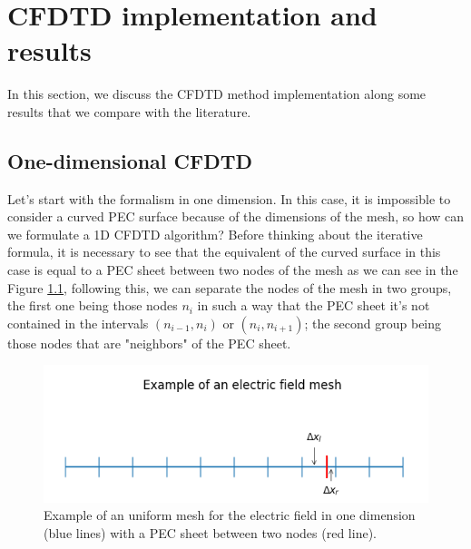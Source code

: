 \documentclass[12pt, oneside]{book}
\begin{document}
\chapter{CFDTD implementation and results}

In this section, we discuss the CFDTD method implementation along some results that we compare with the literature.
\section{One-dimensional CFDTD}
Let's start with the formalism in one dimension. In this case, it is impossible to consider a curved PEC surface because of the dimensions of the mesh, so how can we formulate a 1D CFDTD algorithm? Before thinking about the iterative formula, it is necessary to see that the equivalent of the curved surface in this case is equal to a PEC sheet between two nodes of the mesh as we can see in the Figure \ref{fig:Mesh1D_CFDTD}, following this, we can separate the nodes of the mesh in two groups, the first one being those nodes $n_i$ in such a way that the PEC sheet it's not contained in the intervals $(n_{i-1}, n_i)$ or $(n_i, n_{i+1})$; the second group being those nodes that are "neighbors" of the PEC sheet. 
\begin{figure}[H]
    \centering
    \includegraphics[scale=1.05]{Imagenes/Mesh1D_CFDTD.png}
    \caption{Example of an uniform mesh for the electric field in one dimension (blue lines) with a PEC sheet between two nodes (red line).}
    \label{fig:Mesh1D_CFDTD}
\end{figure}
\end{document}
